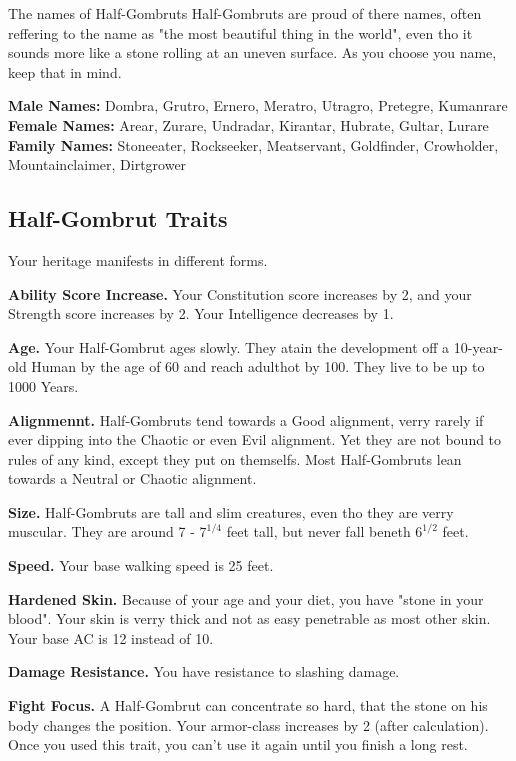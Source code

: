 \documentclass[10pt,twoside,twocolumn,openany]{book}
\begin{document}
\begin{paperbox}{The names of Half-Gombruts}
Half-Gombruts are proud of there names, often reffering to the name as "the most beautiful thing in the world", even tho it sounds more like a stone rolling at an uneven surface. As you choose you name, keep that in mind.
\end{paperbox}

\textbf{Male Names:}
Dombra, Grutro, Ernero, Meratro, Utragro, Pretegre, Kumanrare
\textbf{Female Names:}
Arear, Zurare, Undradar, Kirantar, Hubrate, Gultar, Lurare
\textbf{Family Names:}
Stoneeater, Rockseeker, Meatservant, Goldfinder, Crowholder, Mountainclaimer, Dirtgrower

\subsection{Half-Gombrut Traits}
Your heritage manifests in different forms.

\textbf{Ability Score Increase.} Your Constitution score increases by 2, and your Strength score increases by 2. Your Intelligence decreases by 1.

\textbf{Age.} Your Half-Gombrut ages slowly. They atain the development off a 10-year-old Human by the age of 60 and reach adulthot by 100. They live to be up to 1000 Years.

\textbf{Alignmennt.} Half-Gombruts tend towards a Good alignment, verry rarely if ever dipping into the Chaotic or even Evil alignment. Yet they are not bound to rules of any kind, except they put on themselfs. Most Half-Gombruts lean towards a Neutral or Chaotic alignment.

\textbf{Size.} Half-Gombruts are tall and slim creatures, even tho they are verry muscular. They are around 7 - $7^{1/4}$ feet tall, but never fall beneth $6^{1/2}$ feet.

\textbf{Speed.} Your base walking speed is 25 feet.

\textbf{Hardened Skin.} Because of your age and your diet, you have "stone in your blood". Your skin is verry thick and not as easy penetrable as most other skin. Your base AC is 12 instead of 10.

\textbf{Damage Resistance.} You have resistance to slashing damage.

\textbf{Fight Focus.} A Half-Gombrut can concentrate so hard, that the stone on his body changes the position. Your armor-class increases by 2 (after calculation). Once you used this trait, you can't use it again until you finish a long rest.
\end{document}
